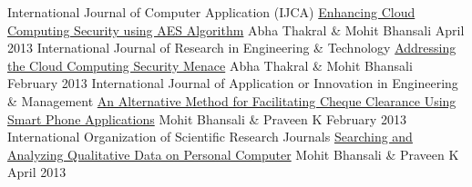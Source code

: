 \begin{cventries}
  \cventry
    {International Journal of Computer Application (IJCA)}
    {\href{https://pdfs.semanticscholar.org/9116/1403b8696baf0915f6cc12c8f4faa23e075f.pdf}{Enhancing Cloud Computing Security using AES Algorithm}}
    {Abha Thakral \& Mohit Bhansali}
    {April 2013}
    {}
  \cventry
    {International Journal of Research in Engineering \& Technology}  {\href{https://s3.amazonaws.com/academia.edu.documents/31122422/ADDRESSING_THE_CLOUD_COMPUTING_SECURITY_MENACE.pdf}{Addressing the Cloud Computing Security Menace}}
    {Abha Thakral \& Mohit Bhansali}
    {February 2013}
    {}
  \cventry
    {International Journal of Application or Innovation in Engineering \& Management}
    {\href{http://www.ijaiem.org/volume2Issue1/IJAIEM-2013-01-30-083.pdf}{An Alternative Method for Facilitating Cheque Clearance Using Smart Phone Applications}}
    {Mohit Bhansali \& Praveen K}
    {February 2013}
    {}
  \cventry
    {International Organization of Scientific Research Journals}
    {\href{https://s3.amazonaws.com/academia.edu.documents/33711870/H01024145.pdf}{Searching and Analyzing Qualitative Data on Personal Computer}}
    {Mohit Bhansali \& Praveen K}
    {April 2013}
    {}
\end{cventries}